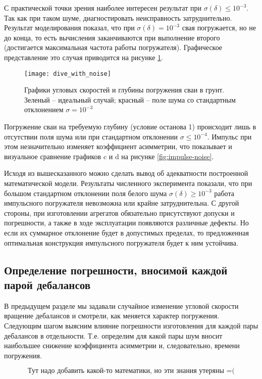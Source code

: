 С практической точки зрения наиболее интересен результат при $\sigma(\delta) \leq 10^{-3}$. Так как при таком шуме, диагностировать
неисправность затруднительно. Результат моделирования показал, что при $\sigma(\delta) = 10^{-3}$ свая погружается, но не до конца,
то есть вычисления заканчиваются при выполнение второго (достигается максимальная частота работы погружателя). Графическое представление
это случая приводится на рисунке \ref{fig:dive_with_noise}.

\begin{figure}[ht]
    \centering
    \texttt{[image: dive\_with\_noise]}
    \caption{Графики угловых скоростей и глубины погружения сваи в грунт.
    Зеленый -- идеальный случай; красный -- поле шума со стандартным отклонением $\sigma = 10^{-3}$}
    \label{fig:dive_with_noise}
\end{figure}

Погружение сваи на требуемую глубину (условие останова 1) происходит лишь в отсутствии поля шума или
при стандартном отклонении $\sigma \leq 10^{-4}$. Импульс при этом незначительно изменяет коэффициент асимметрии,
что показывает и визуальное сравнение графиков c и d на рисунке \ref{fig:impulse-noise}.

Исходя из вышесказанного можно сделать вывод об адекватности построенной математической модели. Результаты численного
эксперимента показали, что при большом стандартном отклонении поля белого шума $\sigma(\delta) \geq 10^{-3}$ работа
импульсного погружателя невозможна или крайне затруднительна. С другой стороны, при изготовлении агрегатов обязательно
присутствуют допуски и погрешности, а также в ходе эксплуатации появляются различные дефекты. Но если их суммарное отклонение
будет в допустимых пределах, то предложенная оптимальная конструкция импульсного погружателя будет к ним устойчива.

\subsection{Определение погрешности, вносимой каждой парой дебалансов}

В предыдущем разделе мы задавали случайное изменение угловой скорости вращение дебалансов и смотрели, как меняется характер погружения.
Следующим шагом выясним влияние погрешности изготовления для каждой пары дебалансов в отдельности. Т.е. определим для какой пары шум вносит
наибольшее снижение коэффициента асимметрии и, следовательно, времени погружения.

\begin{equation}
    \text{Тут надо добавить какой-то математики, но эти знания утеряны =(}
\end{equation}

